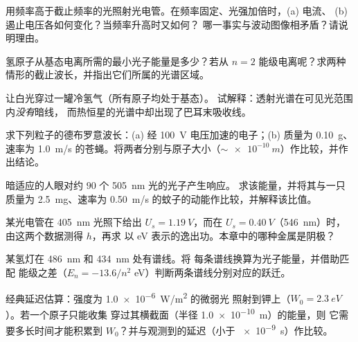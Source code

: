 \begin{exercise}[$\star\star$]\label{exo:g12:quantum-world:7}
用频率高于截止频率的光照射光电管。在频率固定、光强加倍时，(a) 电流、
(b) 遏止电压各如何变化？当频率升高时又如何？
哪一事实与波动图像相矛盾？请说明理由。
\end{exercise}

\begin{exercise}[$\star\star$]\label{exo:g12:quantum-world:8}
氢原子从基态电离所需的最小光子能量是多少？若从
$n = 2$ 能级电离呢？求两种情形的截止波长，并指出它们所属的光谱区域。
\end{exercise}

\begin{exercise}[$\star\star$]\label{exo:g12:quantum-world:9}
让白光穿过一罐冷氢气（所有原子均处于基态）。
试解释：透射光谱在可见光范围内\emph{没有}暗线，
而热恒星的光谱中却出现了巴耳末吸收线。
\end{exercise}

\begin{exercise}[$\star\star$]\label{exo:g12:quantum-world:10}
求下列粒子的德布罗意波长：(a) 经
\qty{100}{V} 电压加速的电子；(b) 质量为 \qty{0.10}{g}、
速率为 \qty{1.0}{m/s} 的苍蝇。将两者分别与原子大小（$\sim \qty{e-10}{m}$）作比较，并作出结论。
\end{exercise}

\begin{exercise}[$\star\star$]\label{exo:g12:quantum-world:11}
暗适应的人眼对约 $90$ 个 \qty{505}{nm} 光的光子产生响应。
求该能量，并将其与一只
质量为 \qty{2.5}{mg}、速率为 \qty{0.50}{m/s} 的蚊子的动能作比较，并解释该比值。
\end{exercise}

\begin{exercise}[$\star\star\star$]\label{exo:g12:quantum-world:12}
某光电管在 \qty{405}{nm} 光照下给出 $U_s = \qty{1.19}{V}$，而在 $U_s =
\qty{0.40}{V}$（\qty{546}{nm}）时，由这两个数据测得 $h$，再求
以 \unit{eV} 表示的逸出功。本章中的哪种金属是阴极？
\end{exercise}

\begin{exercise}[$\star\star\star$]\label{exo:g12:quantum-world:13}
某氢灯在 \qty{486}{nm} 和 \qty{434}{nm} 处有谱线。将
每条谱线换算为光子能量，并借助匹配
能级之差（$E_n = -13.6/n^2$ \unit{eV}）判断两条谱线分别对应的跃迁。
\end{exercise}

\begin{exercise}[$\star\star\star$]\label{exo:g12:quantum-world:14}
经典延迟估算：强度为 \qty{1.0e-6}{W/m^2} 的微弱光
照射到钾上（$W_0 = \qty{2.3}{eV}$）。若一个原子只能收集
穿过其横截面（半径 \qty{1.0e-10}{m}）的能量，则
它需要多长时间才能积累到 $W_0$？并与观测到的延迟（小于 \qty{e-9}{s}）作比较。
\end{exercise}

